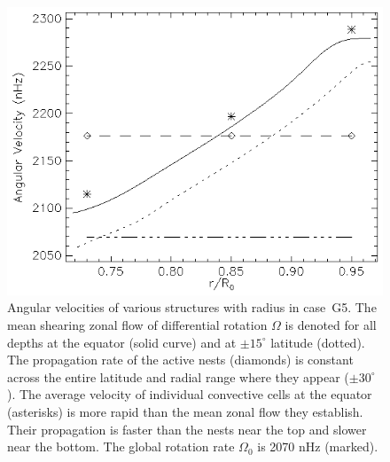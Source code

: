 \begin{figure}[!tp]
  \begin{center}
    \includegraphics[width=0.7\linewidth]{figs/chapter_4/Figure_15.eps}
  \end{center}
  \caption[Angular velocities of various structures with radius in case~G5]
          {Angular velocities of various structures with radius in case~G5.  
  The mean shearing zonal flow of differential rotation $\Omega$ is denoted for all
  depths at the equator (solid curve) and at $\pm
  15^\circ$ latitude (dotted).  The propagation rate of the
  active nests (diamonds) is constant across the 
  entire latitude and radial range where they appear ($\pm 30^\circ$).
  The average velocity of individual convective cells at the equator
  (asterisks) is more rapid than the mean zonal flow they
  establish.  Their propagation is faster than the nests
  near the top and slower near the bottom.
  The global rotation rate $\Omega_0$ is 2070 nHz (marked). 
  \label{fig:patch_velocity_cartoon}}
\end{figure}
 

